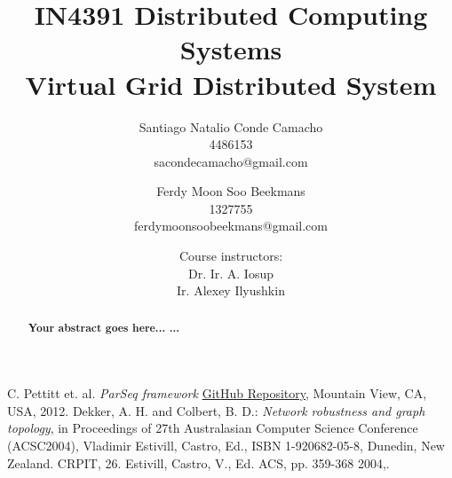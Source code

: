 \documentclass{article}
\title{\textbf{IN4391 Distributed Computing Systems \\Virtual Grid Distributed System}}
\author{Santiago Natalio Conde Camacho  \\ 4486153\\ \small{sacondecamacho@gmail.com} \and Ferdy Moon Soo Beekmans \\1327755 \\ \small{ferdymoonsoobeekmans@gmail.com}}
\date{\small{Course instructors:} \\ Dr. Ir. A. Iosup \\ Ir. Alexey Ilyushkin}
\begin{document}
\maketitle
\begin{abstract}
\textbf{Your abstract goes here...
...}
\end{abstract}






\clearpage

\begin{thebibliography}{9}

C. Pettitt et. al. \textit{ParSeq framework} {\color{magenta}\href{https://github.com/linkedin/parseq}{GitHub Repository}}, Mountain View, CA, USA, 2012.
Dekker, A. H. and Colbert, B. D.: \textit{Network robustness and graph topology}, in Proceedings of 27th Australasian Computer Science Conference (ACSC2004), Vladimir Estivill, Castro, Ed., ISBN 1-920682-05-8, Dunedin, New Zealand. CRPIT, 26. Estivill, Castro, V., Ed. ACS, pp. 359-368 2004,.
\end{thebibliography}
\end{document}
